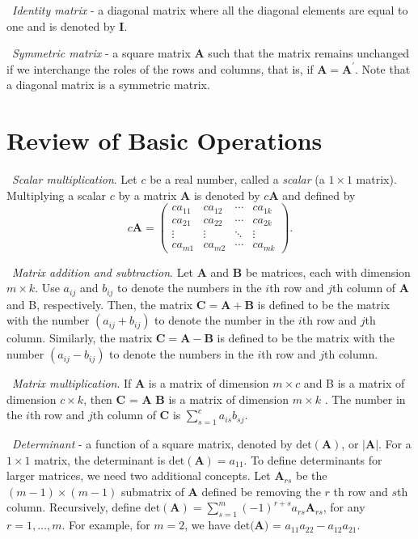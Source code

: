 \textbullet\ \emph{Identity matrix} - a diagonal matrix where all the
diagonal elements are equal to one and is denoted by $\mathbf{I}$.

\textbullet\ \emph{Symmetric matrix} - a square matrix $\mathbf{A}$
such that the matrix remains unchanged if we interchange the roles
of the rows and columns, that is, if $\mathbf{A=A}^{\prime}$. Note
that a diagonal matrix is a symmetric matrix.

\section{Review of Basic Operations}

\quad \textbullet\ \emph{Scalar multiplication}. Let $c$ be a real
number, called a \emph{scalar }(a $1 \times 1$ matrix). Multiplying
a scalar $ c$ by a matrix $\mathbf{A}$ is denoted by $c \mathbf{A}$
and defined by
\begin{equation*}
c\mathbf{A=}\left(
\begin{array}{cccc}
ca_{11} & ca_{12} & \cdots & ca_{1k} \\
ca_{21} & ca_{22} & \cdots & ca_{2k} \\
\vdots & \vdots & \ddots & \vdots \\
ca_{m1} & ca_{m2} & \cdots & ca_{mk}
\end{array}
\right) .
\end{equation*}

\textbullet\ \emph{Matrix addition and subtraction}. Let
$\mathbf{A}$ and $ \mathbf{B}$ be matrices, each with dimension
$m\times k$. Use $a_{ij}$ and $ b_{ij}$ to denote the numbers in the
$i$th row and $j$th column of $\mathbf{A }$ and B, respectively.
Then, the matrix $\mathbf{C}=\mathbf{A}+\mathbf{B}$ is defined to be
the matrix with the number $(a_{ij}+b_{ij})$ to denote the number in
the $i$th row and $j$th column. Similarly, the matrix $\mathbf{C}=
\mathbf{A}-\mathbf{B}$ is defined to be the matrix with the number
$(a_{ij}-b_{ij})$ to denote the numbers in the $i$th row and $j$th
column.

\textbullet\ \emph{Matrix multiplication}. If $\mathbf{A}$ is a
matrix of dimension $m\times c$ and B is a matrix of dimension
$c\times k$, then $ \mathbf{C}$ = $\mathbf{A}$ $\mathbf{B}$ is a
matrix of dimension $m\times k$ . The number in the $i$th row and
$j$th column of $\mathbf{C}$ is $ \sum_{s=1}^c a_{is} b_{sj}.$

\textbullet\ \emph{Determinant} - a function of a square matrix,
denoted by $ \mathrm{det}(\mathbf{A})$, or $|\mathbf{A}|$. For a
$1\times 1$ matrix, the determinant is
$\mathrm{det}(\mathbf{A})=a_{11}$. To define determinants for larger
matrices, we need two additional concepts. Let $\mathbf{A}_{rs}$ be
the $(m-1)\times (m-1)$ submatrix of $\mathbf{A}$ defined be
removing the $r$ th row and $s$th column. Recursively, define
$\mathrm{det}(\mathbf{A}) = \sum_{s=1}^m (-1)^{r+s} a_{rs}
\mathbf{A}_{rs}$, for any $r=1,\ldots ,m$. For example, for $m=2$,
we have $\mathrm{det}(\mathbf{A)}$ = $ a_{11}a_{22}-a_{12}a_{21}$.

